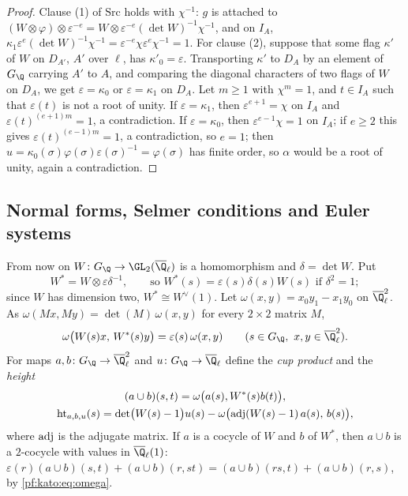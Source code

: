\begin{proof}
Clause (1) of $\mathrm{Src}$ holds with $\chi^{-1}$: $g$ is attached to
$(W\otimes\varphi)\otimes\varepsilon^{-e}=W\otimes\varepsilon^{-e}(\det W)^{-1}\chi^{-1}$, and on $I_A$,
$\kappa_1\varepsilon^e(\det W)^{-1}\chi^{-1}=\varepsilon^{-e}\chi\varepsilon^e\chi^{-1}=1$. For clause (2), suppose that some flag $\kappa'$ of
$W$ on $D_{A'}$, $A'$ over $\ell$, has $\kappa'_0=\varepsilon$. Transporting $\kappa'$ to $D_A$ by an element of $G_\Q$ carrying $A'$
to $A$, and comparing the diagonal characters of two flags of $W$ on $D_A$, we get $\varepsilon=\kappa_0$ or $\varepsilon=\kappa_1$ on
$D_A$. Let $m\ge1$ with $\chi^m=1$, and $t\in I_A$ such that $\varepsilon(t)$ is not a root of unity. If $\varepsilon=\kappa_1$, then
$\varepsilon^{e+1}=\chi$ on $I_A$ and $\varepsilon(t)^{(e+1)m}=1$, a contradiction. If $\varepsilon=\kappa_0$, then $\varepsilon^{e-1}\chi=1$ on $I_A$;
if $e\ge2$ this gives $\varepsilon(t)^{(e-1)m}=1$, a contradiction, so $e=1$; then $u=\kappa_0(\sigma)\varphi(\sigma)\varepsilon(\sigma)^{-1}=\varphi(\sigma)$
has finite order, so $\alpha$ would be a root of unity, again a contradiction.
\end{proof}

\subsection{Normal forms, Selmer conditions and Euler systems}\label{pf:kato:sec:nf}

From now on $W\colon G_\Q\to\GL_2(\katoQlb)$ is a homomorphism and $\delta=\det W$. Put
\[
  W^*=W\otimes\varepsilon\delta^{-1},\qquad\text{so } W^*(s)=\varepsilon(s)\delta(s)W(s)\text{ if }\delta^2=1;
\]
since $W$ has dimension two, $W^*\cong W^\vee(1)$. Let $\omega(x,y)=x_0y_1-x_1y_0$ on $\katoQlb^2$. As
$\omega(Mx,My)=\det(M)\,\omega(x,y)$ for every $2\times2$ matrix $M$,
\begin{equation}\label{pf:kato:eq:omega}
  \omega\bigl(W(s)x,\,W^*(s)y\bigr)=\varepsilon(s)\,\omega(x,y)\qquad(s\in G_\Q,\ x,y\in\katoQlb^2).
\end{equation}
For maps $a,b\colon G_\Q\to\katoQlb^2$ and $u\colon G_\Q\to\katoQlb$ define the \emph{cup product} and the
\emph{height}
\begin{equation}\label{pf:kato:eq:cupht}
\begin{gathered}
  (a\cup b)(s,t)=\omega\bigl(a(s),W^*(s)b(t)\bigr),\\
  \mathrm{ht}_{a,b,u}(s)=\det\bigl(W(s)-1\bigr)u(s)-\omega\bigl(\operatorname{adj}(W(s)-1)\,a(s),\,b(s)\bigr),
\end{gathered}
\end{equation}
where $\operatorname{adj}$ is the adjugate matrix. If $a$ is a cocycle of $W$ and $b$ of $W^*$, then $a\cup b$ is a
$2$-cocycle with values in $\katoQlb(1)$: $\varepsilon(r)(a\cup b)(s,t)+(a\cup b)(r,st)=(a\cup b)(rs,t)+(a\cup b)(r,s)$, by
\eqref{pf:kato:eq:omega}.

